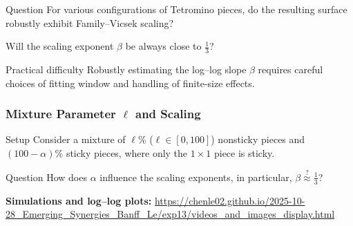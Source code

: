 \documentclass[9pt,table,xcolor=dvipsnames]{beamer}
\begin{document}
\begin{frame}[fragile,t] %

  \begin{problock}{Question}
    For various configurations of Tetromino pieces, do the resulting surface
    robustly exhibit Family--Vicsek scaling?

    Will the scaling exponent $\beta$ be always close to $ \displaystyle \frac{1}{3}$?
  \end{problock}
  \vfill

  \begin{problock}{Practical difficulty}
    Robustly estimating the log--log slope $\beta$ requires careful choices of
    fitting window and handling of finite-size effects.
  \end{problock}

\end{frame}
\begin{frame}[fragile] %
  \frametitle{Mixture Parameter $\ell$ and Scaling}

  \begin{assblock}{Setup}
    Consider a mixture of $\ell\%$ ($\ell \in [0, 100]$) nonsticky pieces and
    $(100{-}\alpha)\%$ sticky pieces, where only the $1\times1$ piece is sticky.
  \end{assblock}

  \vfill
  \begin{problock}{Question}
    How does $\alpha$ influence the scaling exponents, in particular, $ \displaystyle \beta \stackrel{?}{\approx} \frac{1}{3}$?
  \end{problock}
  \vfill

  \vspace{0.5em}
  {\small
    \textbf{Simulations and log--log plots:}\newline
    \url{https://chenle02.github.io/2025-10-28_Emerging_Synergies_Banff_Le/exp13/videos_and_images_display.html}
  }
\end{frame}
\end{document}
